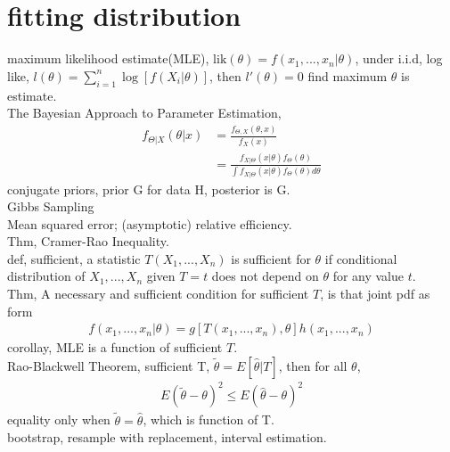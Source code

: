 \documentclass[paper=a4, fontsize=11pt]{scrartcl} %
\numberwithin{equation}{section} %
\numberwithin{figure}{section} %
\numberwithin{table}{section} %
\begin{document}
\section{fitting distribution}
maximum likelihood estimate(MLE), $\text{lik}(\theta) = f(x_1,...,x_n|\theta)$, under i.i.d, log like, $l(\theta) = \sum_{i=1}^n \log [f(X_i|\theta)]$, then $l'(\theta)=0$ find maximum $\theta$ is estimate.\\
The Bayesian Approach to Parameter Estimation, 
\begin{align}
	f_{\Theta| X}(\theta|x) &= \frac{f_{\Theta,X}(\theta,x)}{f_X(x)} \\
		&= \frac{f_{X|\Theta}(x|\theta)f_\Theta(\theta)} {\int f_{X|\Theta}(x|\theta)f_\Theta(\theta) d\theta}
\end{align}
conjugate priors, prior G for data H, posterior is G.\\
Gibbs Sampling\\
Mean squared error; (asymptotic) relative efficiency.\\
Thm, Cramer-Rao Inequality.\\
def, sufficient, a statistic $T(X_1,...,X_n)$ is sufficient for $\theta$ if conditional distribution of $X_1,...,X_n$ given $T=t$ does not depend on $\theta$ for any value $t$.\\
Thm, A necessary and sufficient condition for sufficient $T$, is that joint pdf as form
\begin{align}
	f(x_1,...,x_n|\theta) = g[T(x_1,...,x_n),\theta] h(x_1,...,x_n)
\end{align}
corollay, MLE is a function of sufficient $T$.\\
Rao-Blackwell Theorem, sufficient T, $\tilde{\theta}=E[\widehat{\theta}|T]$, then for all $\theta$,
\begin{align}
	E(\tilde{\theta}-\theta)^2 \leq E(\widehat{\theta}-\theta)^2
\end{align}
equality only when $\tilde{\theta}=\widehat{\theta}$, which is function of T.\\
bootstrap, resample with replacement, interval estimation.
\end{document}
